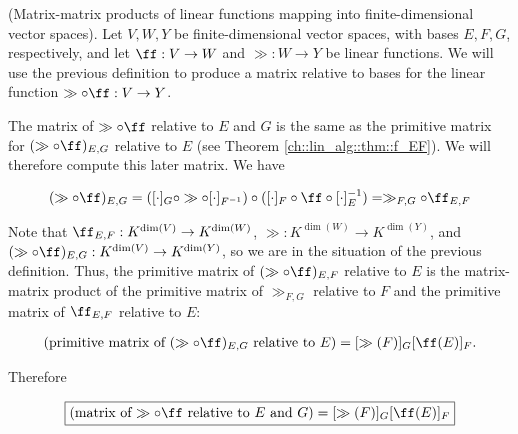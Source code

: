 \begin{theorem}
\label{ch::lin_alg::thm::matrix_matrix_product_relative_to_bases}

    (Matrix-matrix products of linear functions mapping into finite-dimensional vector spaces). 
    Let $V, W, Y$ be finite-dimensional vector spaces, with bases $E, F, G$, respectively, and let $\ff:V \rightarrow W$ and $\gg:W \rightarrow Y$ be linear functions. We will use the previous definition to produce a matrix relative to bases for the linear function $\gg \circ \ff:V \rightarrow Y$.
    
    The matrix of $\gg \circ \ff$ relative to $E$ and $G$ is the same as the primitive matrix for $(\gg \circ \ff)_{E,G}$ relative to $E$ (see Theorem \ref{ch::lin_alg::thm::f_EF}). We will therefore compute this later matrix. We have
    
    \begin{align*}
        (\gg \circ \ff)_{E,G} = ([\cdot]_G \circ \gg \circ [\cdot]_{F^{-1}}) \circ ([\cdot]_F \circ \ff \circ [\cdot]_E^{-1}) = \gg_{F,G} \circ \ff_{E,F}
    \end{align*}
    
    Note that $\ff_{E,F}:K^{\dim(V)} \rightarrow K^{\dim(W)}$, $\gg:K^{\dim(W)} \rightarrow K^{\dim(Y)}$, and $(\gg \circ \ff)_{E,G}:K^{\dim(V)} \rightarrow K^{\dim(Y)}$, so we are in the situation of the previous definition. Thus, the primitive matrix of $(\gg \circ \ff)_{E,F}$ relative to $E$ is the matrix-matrix product of the primitive matrix of $\gg_{F,G}$ relative to $F$ and the primitive matrix of $\ff_{E,F}$ relative to $E$:
    
    \begin{align*}
        (\text{primitive matrix of $(\gg \circ \ff)_{E,G}$ relative to $E$}) =  [\gg(F)]_G [\ff(E)]_F.
    \end{align*}
    
    Therefore
    
    \begin{align*}
        \boxed
        {
            (\text{matrix of $\gg \circ \ff$ relative to $E$ and $G$}) = [\gg(F)]_G [\ff(E)]_F
        }
    \end{align*}
\end{theorem}